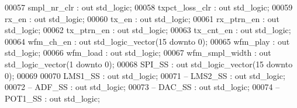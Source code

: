 \begin{DoxyCode}
00057         \textcolor{vhdlchar}{smpl_nr_clr}     \textcolor{vhdlchar}{:} \textcolor{keywordflow}{out} \textcolor{comment}{std\_logic};
00058         \textcolor{vhdlchar}{txpct_loss_clr}  \textcolor{vhdlchar}{:} \textcolor{keywordflow}{out} \textcolor{comment}{std\_logic};
00059         \textcolor{vhdlchar}{rx_en}               \textcolor{vhdlchar}{:} \textcolor{keywordflow}{out} \textcolor{comment}{std\_logic};
00060         \textcolor{vhdlchar}{tx_en}               \textcolor{vhdlchar}{:} \textcolor{keywordflow}{out} \textcolor{comment}{std\_logic};
00061         \textcolor{vhdlchar}{rx_ptrn_en}      \textcolor{vhdlchar}{:} \textcolor{keywordflow}{out} \textcolor{comment}{std\_logic};
00062         \textcolor{vhdlchar}{tx_ptrn_en}      \textcolor{vhdlchar}{:} \textcolor{keywordflow}{out} \textcolor{comment}{std\_logic};
00063         \textcolor{vhdlchar}{tx_cnt_en}       \textcolor{vhdlchar}{:} \textcolor{keywordflow}{out} \textcolor{comment}{std\_logic};
00064         \textcolor{vhdlchar}{wfm_ch_en}       \textcolor{vhdlchar}{:} \textcolor{keywordflow}{out} \textcolor{comment}{std\_logic\_vector}\textcolor{vhdlchar}{(}\textcolor{vhdllogic}{}\textcolor{vhdllogic}{15} \textcolor{keywordflow}{downto} \textcolor{vhdllogic}{}\textcolor{vhdllogic}{0}\textcolor{vhdlchar}{)};
00065         \textcolor{vhdlchar}{wfm_play}            \textcolor{vhdlchar}{:} \textcolor{keywordflow}{out} \textcolor{comment}{std\_logic};
00066         \textcolor{vhdlchar}{wfm_load}            \textcolor{vhdlchar}{:} \textcolor{keywordflow}{out} \textcolor{comment}{std\_logic};
00067         \textcolor{vhdlchar}{wfm_smpl_width}  \textcolor{vhdlchar}{:} \textcolor{keywordflow}{out} \textcolor{comment}{std\_logic\_vector}\textcolor{vhdlchar}{(}\textcolor{vhdllogic}{}\textcolor{vhdllogic}{1} \textcolor{keywordflow}{downto} \textcolor{vhdllogic}{}\textcolor{vhdllogic}{0}\textcolor{vhdlchar}{)};
00068         \textcolor{vhdlchar}{SPI_SS}          \textcolor{vhdlchar}{:} \textcolor{keywordflow}{out} \textcolor{comment}{std\_logic\_vector}\textcolor{vhdlchar}{(}\textcolor{vhdllogic}{}\textcolor{vhdllogic}{15} \textcolor{keywordflow}{downto} \textcolor{vhdllogic}{}\textcolor{vhdllogic}{0}\textcolor{vhdlchar}{)};
00069         
00070         \textcolor{vhdlchar}{LMS1_SS}         \textcolor{vhdlchar}{:} \textcolor{keywordflow}{out} \textcolor{comment}{std\_logic};
00071 \textcolor{keyword}{--      LMS2\_SS         : out std\_logic;}
00072 \textcolor{keyword}{--      ADF\_SS          : out std\_logic;}
00073 \textcolor{keyword}{--      DAC\_SS          : out std\_logic;}
00074 \textcolor{keyword}{--      POT1\_SS         : out std\_logic;}

\end{DoxyCode}
